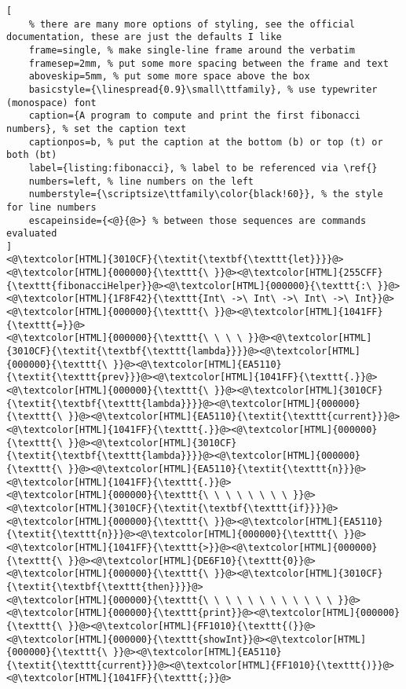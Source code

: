 \begin{lstlisting}[
	% there are many more options of styling, see the official documentation, these are just the defaults I like
	frame=single, % make single-line frame around the verbatim
	framesep=2mm, % put some more spacing between the frame and text
	aboveskip=5mm, % put some more space above the box
	basicstyle={\linespread{0.9}\small\ttfamily}, % use typewriter (monospace) font
	caption={A program to compute and print the first fibonacci numbers}, % set the caption text
	captionpos=b, % put the caption at the bottom (b) or top (t) or both (bt)
    label={listing:fibonacci}, % label to be referenced via \ref{}
	numbers=left, % line numbers on the left
	numberstyle={\scriptsize\ttfamily\color{black!60}}, % the style for line numbers
	escapeinside={<@}{@>} % between those sequences are commands evaluated
]
<@\textcolor[HTML]{3010CF}{\textit{\textbf{\texttt{let}}}}@><@\textcolor[HTML]{000000}{\texttt{\ }}@><@\textcolor[HTML]{255CFF}{\texttt{fibonacciHelper}}@><@\textcolor[HTML]{000000}{\texttt{:\ }}@><@\textcolor[HTML]{1F8F42}{\texttt{Int\ ->\ Int\ ->\ Int\ ->\ Int}}@><@\textcolor[HTML]{000000}{\texttt{\ }}@><@\textcolor[HTML]{1041FF}{\texttt{=}}@>
<@\textcolor[HTML]{000000}{\texttt{\ \ \ \ }}@><@\textcolor[HTML]{3010CF}{\textit{\textbf{\texttt{lambda}}}}@><@\textcolor[HTML]{000000}{\texttt{\ }}@><@\textcolor[HTML]{EA5110}{\textit{\texttt{prev}}}@><@\textcolor[HTML]{1041FF}{\texttt{.}}@><@\textcolor[HTML]{000000}{\texttt{\ }}@><@\textcolor[HTML]{3010CF}{\textit{\textbf{\texttt{lambda}}}}@><@\textcolor[HTML]{000000}{\texttt{\ }}@><@\textcolor[HTML]{EA5110}{\textit{\texttt{current}}}@><@\textcolor[HTML]{1041FF}{\texttt{.}}@><@\textcolor[HTML]{000000}{\texttt{\ }}@><@\textcolor[HTML]{3010CF}{\textit{\textbf{\texttt{lambda}}}}@><@\textcolor[HTML]{000000}{\texttt{\ }}@><@\textcolor[HTML]{EA5110}{\textit{\texttt{n}}}@><@\textcolor[HTML]{1041FF}{\texttt{.}}@>
<@\textcolor[HTML]{000000}{\texttt{\ \ \ \ \ \ \ \ }}@><@\textcolor[HTML]{3010CF}{\textit{\textbf{\texttt{if}}}}@><@\textcolor[HTML]{000000}{\texttt{\ }}@><@\textcolor[HTML]{EA5110}{\textit{\texttt{n}}}@><@\textcolor[HTML]{000000}{\texttt{\ }}@><@\textcolor[HTML]{1041FF}{\texttt{>}}@><@\textcolor[HTML]{000000}{\texttt{\ }}@><@\textcolor[HTML]{DE6F10}{\texttt{0}}@><@\textcolor[HTML]{000000}{\texttt{\ }}@><@\textcolor[HTML]{3010CF}{\textit{\textbf{\texttt{then}}}}@>
<@\textcolor[HTML]{000000}{\texttt{\ \ \ \ \ \ \ \ \ \ \ \ }}@><@\textcolor[HTML]{000000}{\texttt{print}}@><@\textcolor[HTML]{000000}{\texttt{\ }}@><@\textcolor[HTML]{FF1010}{\texttt{(}}@><@\textcolor[HTML]{000000}{\texttt{showInt}}@><@\textcolor[HTML]{000000}{\texttt{\ }}@><@\textcolor[HTML]{EA5110}{\textit{\texttt{current}}}@><@\textcolor[HTML]{FF1010}{\texttt{)}}@><@\textcolor[HTML]{1041FF}{\texttt{;}}@>

\end{lstlisting}
